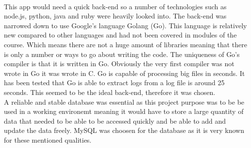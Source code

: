 \\ This app would need a quick back-end so a number of technologies such as node.js, python, java and ruby were heavily looked into. The back-end was narrowed down to use Google's language Golang (Go). This language is relatively new compared to other languages and had not been covered in modules of the course. Which means there are not a huge amount of libraries meaning that there is only a number or ways to go about writing the code.  The uniqueness of Go's compiler is that it is written in Go. Obviously the very first compiler was not wrote in Go it was wrote in C. Go is capable of processing big files in seconds. It has been tested that Go is able to extract logs from a log file is around 25 seconds. This seemed to be the ideal back-end, therefore it was chosen.
\\ A reliable and stable database was essential as this project purpose was to be be used in a working environemt meaning it would have to store a large quantity of data that needed to be able to be accessed quickly and be able to add and update the data freely. MySQL was choosen for the database as it is very known for these mentioned qualities. 